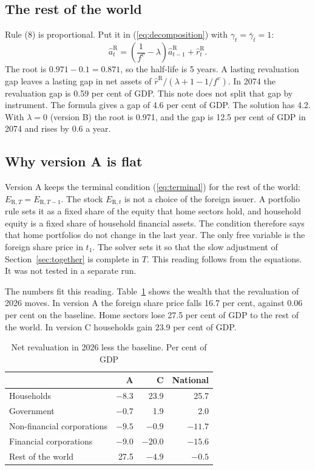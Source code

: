 \documentclass[11pt,a4paper]{article}
\newcommand{\row}{\mathrm{R}}
\begin{document}
\subsection{The rest of the world}

Rule (8) is proportional. Put it in (\ref{eq:decomposition}) with $\gamma_t = \bar{\gamma}_t = 1$:
\begin{equation}
\hat{a}^{\row}_t = \left( \frac{1}{f^v} - \lambda \right) \hat{a}^{\row}_{t-1} + \hat{r}^{\row}_t .
\end{equation}
The root is $0.971 - 0.1 = 0.871$, so the half-life is 5 years. A lasting revaluation gap leaves a lasting gap in net assets of $\hat{r}^{\row}/(\lambda + 1 - 1/f^v)$.
In 2074 the revaluation gap is 0.59 per cent of GDP. This note does not split that gap by instrument.
The formula gives a gap of 4.6 per cent of GDP. The solution has 4.2.
With $\lambda = 0$ (version B) the root is 0.971, and the gap is 12.5 per cent of GDP in 2074 and rises by 0.6 a year.

\subsection{Why version A is flat}
\label{sec:flat}

Version A keeps the terminal condition (\ref{eq:terminal}) for the rest of the world: $E_{\row,T} = E_{\row,T-1}$.
The stock $E_{\row,t}$ is not a choice of the foreign issuer. A portfolio rule sets it as a fixed share of the equity that home sectors hold, and household equity is a fixed share of household financial assets.
The condition therefore says that home portfolios do not change in the last year.
The only free variable is the foreign share price in $t_1$.
The solver sets it so that the slow adjustment of Section~\ref{sec:together} is complete in $T$.
This reading follows from the equations. It was not tested in a separate run.

The numbers fit this reading. Table~\ref{tab:jump} shows the wealth that the revaluation of 2026 moves.
In version A the foreign share price falls 16.7 per cent, against 0.06 per cent on the baseline. Home sectors lose 27.5 per cent of GDP to the rest of the world.
In version C households gain 23.9 per cent of GDP.

\begin{table}[ht]
\centering
\small
\caption{Net revaluation in 2026 less the baseline. Per cent of GDP}
\label{tab:jump}
\begin{tabular}{@{}lrrr@{}}
\toprule
 & A & C & National \\
\midrule
Households & $-8.3$ & 23.9 & 25.7 \\
Government & $-0.7$ & 1.9 & 2.0 \\
Non-financial corporations & $-9.5$ & $-0.9$ & $-11.7$ \\
Financial corporations & $-9.0$ & $-20.0$ & $-15.6$ \\
Rest of the world & 27.5 & $-4.9$ & $-0.5$ \\
\bottomrule
\end{tabular}
\end{table}
\end{document}

